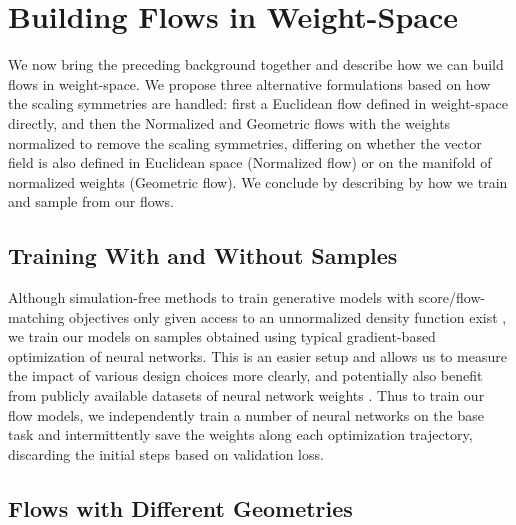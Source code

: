 
\chapter{Building Flows in Weight-Space} \label{chapter:method}

We now bring the preceding background together and describe how we can build flows in weight-space. We propose three alternative formulations based on how the scaling symmetries are handled: first a Euclidean flow defined in weight-space directly, and then the Normalized and Geometric flows with the weights normalized to remove the scaling symmetries, differing on whether the vector field is also defined in Euclidean space (Normalized flow) or on the manifold of normalized weights (Geometric flow). We conclude by describing by how we train and sample from our flows. 

\section{Training With and Without Samples}

Although simulation-free methods to train generative models with score/flow-matching objectives only given access to an unnormalized density function exist \citep{akhound-sadeghIteratedDenoisingEnergy2024}, we train our models on samples obtained using typical gradient-based optimization of neural networks. This is an easier setup and allows us to measure the impact of various design choices more clearly, and potentially also benefit from publicly available datasets of neural network weights \citep{schurholtModelZoosDataset2022,peeblesLearningLearnGenerative2022}. Thus to train our flow models, we independently train a number of neural networks on the base task and intermittently save the weights along each optimization trajectory, discarding the initial steps based on validation loss. 

\section{Flows with Different Geometries}

